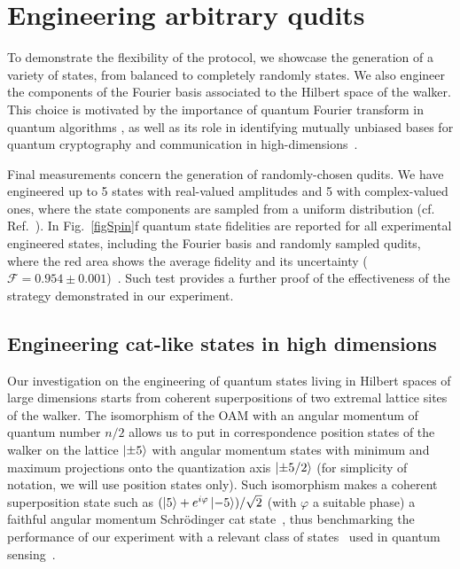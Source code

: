 \section{Engineering arbitrary qudits}
\label{sec:expQWs:arbitrary_qudits}

To demonstrate the flexibility of the protocol, we showcase the generation of a variety of states, from balanced to completely randomly states.
We also engineer the components of the Fourier basis associated to the Hilbert space of the walker. This choice is motivated by the importance of quantum Fourier transform in quantum algorithms \cite{nielsen2002quantum}, as well as its role in identifying mutually unbiased bases for quantum cryptography and communication in high-dimensions~\cite{durt2010mutually,bandyopadhyay2002new,brierley2009constructing,dambrosio2013test}.

Final measurements concern the generation of randomly-chosen qudits. We have engineered up to 5 states with real-valued amplitudes and 5 with complex-valued ones, where the state components are sampled from a uniform distribution (cf. Ref.~\cite{SI}).
In Fig.~\ref{figSpin}f quantum state fidelities are reported for all experimental engineered states, including the Fourier basis and randomly sampled qudits, where the red area shows the average fidelity and its uncertainty ($\mathcal{F}{=}0.954 \pm 0.001$)~\cite{SI}. Such test provides a further proof of the effectiveness of the strategy demonstrated in our experiment.

\subsection{Engineering cat-like states in high dimensions}
\label{subsec:expQWs:catstates}

Our investigation on the engineering of quantum states living in Hilbert spaces of large dimensions starts from coherent superpositions of two extremal lattice sites of the walker. The isomorphism of the OAM with an angular momentum of quantum number $n/2$ allows us to put in correspondence position states of the walker on the lattice $\ket{\pm 5}$ with angular momentum states with minimum and maximum projections onto the quantization axis $\ket{\pm 5/2}$ (for simplicity of notation, we will use position states only). Such isomorphism makes a coherent superposition state such as $(\ket{5}+e^{i\varphi}\ket{-5})/\sqrt{2}$ (with $\varphi$ a suitable phase) a faithful angular momentum Schr\"odinger cat state~\cite{militello2006distilling}, thus benchmarking the performance of our experiment with a relevant class of states~\cite{chandrashekar2008optimizing,zhang2016creating,majury2016robust} used in quantum sensing~\cite{fickler2012quantum,dambrosio2013photonic}.

